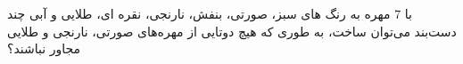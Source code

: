 \p
با 
$7$
 مهره به رنگ ها‌ی سبز، صورتی، بنفش، نارنجی، نقره ای، طلایی و آبی چند دست‌بند می‌توان ساخت، به طوری که هیچ دوتایی از مهره‌های صورتی، نارنجی و طلایی مجاور نباشند؟